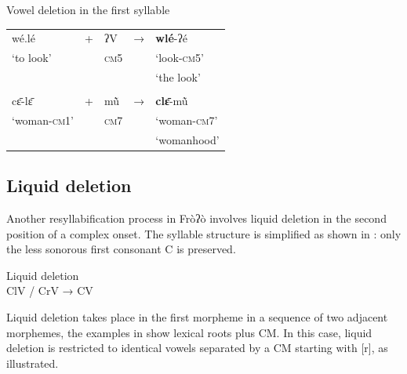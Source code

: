 \documentclass[output=paper]{langscibook}
\begin{document}
    \begin{exe}
        \ex Vowel deletion in the first syllable\label{ex:traore:vowelDeletionFirstSyllable:25}\\
        \begin{tabularx}{.5\textwidth}{l l l l l}
        wé.lé           &        +    & ʔV                  &       →       &        \textbf{wlé}{}-ʔé \\
        `to look'       &    {}       &   \textsc{cm}5      &      {}       &       `look-\textsc{cm}5'\\
                        &           &                       &               &       `the look'          \\
                                &           &                       &               &     \\
        cɛ̄-lɛ̄          &     +      & mũ̀              &       →       &    \textbf{clɛ̄}-mũ̀  \\
        `woman-\textsc{cm}1'    &   &   \textsc{cm}7        &               &   `woman-\textsc{cm}7'\\
                                &           &                       &               &  `womanhood'   \\
        \end{tabularx}
    \end{exe}

\subsection{ Liquid deletion}
\label{sec:traore:liquid_deletion:3c}

Another resyllabification process in Fròʔò involves liquid deletion in the second position of a complex onset. The syllable structure is simplified as shown in : only the less sonorous first consonant C is preserved.

\begin{exe}
    \ex Liquid deletion \label{ex:traore:liquidDeletion:26}\\
    ClV / CrV → CV\\
\end{exe}

Liquid deletion takes place in the first morpheme in a sequence of two adjacent morphemes, the examples in  show lexical roots plus CM. In this case, liquid deletion is restricted to identical vowels separated by a CM starting with [r], as illustrated.
    
\end{document}
